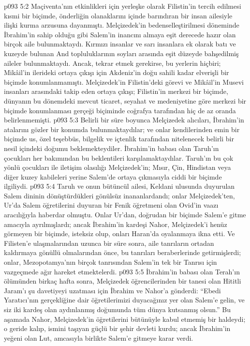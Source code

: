 \vs p093 5:2 Maçiventa’nın etkinlikleri için yerleşke olarak Filistin’in tercih edilmesi kısmi bir biçimde, önderliğin olanaklarını içinde barındıran bir insan ailesiyle ilişki kurma arzusuna dayanmıştı. Melçizedek’in bedenselleştirilmesi döneminde İbrahim’in sahip olduğu gibi Salem’in inancını almaya eşit derecede hazır olan birçok aile bulunmaktaydı. Kırmızı insanlar ve sarı insanlara ek olarak batı ve kuzeyde bulunan And topluluklarının soyları arasında eşit düzeyde bahşedilmiş aileler bulunmaktaydı. Ancak, tekrar etmek gerekirse, bu yerlerin hiçbiri; Mikâil’in ilerideki ortaya çıkışı için Akdeniz’in doğu sahili kadar elverişli bir biçimde konumlanmamıştı. Melçizedek’in Filistin’deki görevi ve Mikâil’in Musevi insanları arasındaki takip eden ortaya çıkışı; Filistin’in merkezi bir biçimde, dünyanın bu dönemdeki mevcut ticaret, seyahat ve medeniyetine göre merkezi bir biçimde konumlanması gerçeği biçiminde coğrafya tarafından hiç de az oranda belirlenmemişti.
\vs p093 5:3 Belirli bir süre boyunca Melçizedek alıcıları, İbrahim’in atalarını gözler bir konumda bulunmaktaydılar; ve onlar kendilerinden emin bir biçimde us, özel teşebbüs, bilgelik ve içtenlik tarafından nitelenecek belirli bir nesil içindeki doğumu beklemekteydiler. İbrahim’in babası olan Taruh’ın çocukları her bakımından bu beklentileri karşılamaktaydılar. Taruh’ın bu çok yönlü çocukları ile iletişim olasılığı Melçizedek’in; Mısır, Çin, Hindistan veya diğer kuzey kabileleri yerine Salem’de ortaya çıkmasıyla ciddi bir biçimde ilgiliydi.
\vs p093 5:4 Taruh ve onun bütüncül ailesi, Keldani ulusunda duyurulan Salem dininin dönüştürdükleri gönülsüz inananlardandı; onlar Melçizedek’ten, Ur’da Salem öğretilerini duyuran bir Fenik öğretmeni olan Ovid’in vaazı aracılığıyla haberdar olmuştu. Onlar Ur’dan, doğrudan bir biçimde Salem’e gitme amacıyla ayrılmışlardı; ancak İbrahim’in kardeşi Nahor, Melçizedek’i henüz görmeyen bir biçimde, isteksiz olup, onları Haran’da oyalanmaya ikna etti. Ve Filisten’e ulaşmalarından uzunca bir süre sonra, aile tanrıların  ortadan kaldırmaya gönüllü olmalarından önce, bu tanrıları beraberlerinde getirmişlerdi; onlar, Mezopotamya’nın birçok tanrısından Salem’in tek bir Tanrısı için vazgeçmede ağır hareket etmektelerdi.
\vs p093 5:5 İbrahim’in babası olan Terah’ın ölümünden birkaç hafta sonra, Melçizedek öğrencilerinden bir tanesi olan Hititli Jaram’ı şu davetiyeyi uzatması için İbrahim ve Nahor’a gönderdi: “Ebedi Yaratıcı’nın gerçekliğine dair öğretilerimizi duyacağınız yer olan Salem’e gelin, ve siz iki kardeş olan aydınlanmış doğumunda tüm dünya kutsanmış olsun.” Bu aşamada Nahor, Melçizedek’in öğretilerini bütünüyle kabul etmemiş bir haldeydi; o geride kalıp, ismini taşıyan güçlü bir şehir devleti kurdu; ancak İbrahim’in yeğeni olan Lut, amcasıyla birlikte Salem’e gitmeye karar verdi.
